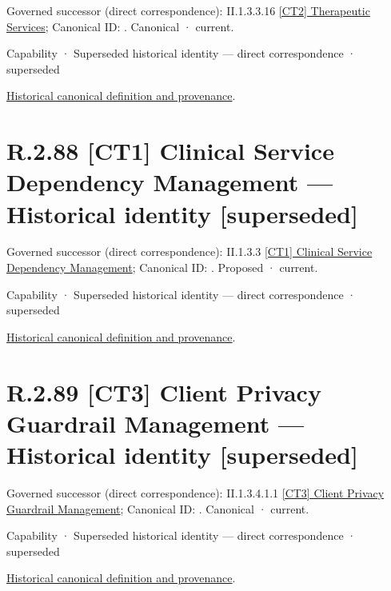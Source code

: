 {\small Governed successor (direct correspondence): II.1.3.3.16 \hyperref[element:b512b6d326004cb7b91a627fe6dbd8be]{[CT2] Therapeutic Services}; Canonical ID: \texttt{}. Canonical · current.}\par
\label{element:54032b52ee444bfe8b611fb9e8e2ba10}
{\small Capability · Superseded historical identity — direct correspondence · superseded}\par
\href{../../../../continuum/strategy/capability/54032b52ee444bfe8b611fb9e8e2ba10.md}{Historical canonical definition and provenance}.\par
\section*{R.2.88 [CT1] Clinical Service Dependency Management — Historical identity [superseded]}
\label{navigation:R.2.88}

{\small Governed successor (direct correspondence): II.1.3.3 \hyperref[element:232db9b8b47c450cb0aa9acaf539c09d]{[CT1] Clinical Service Dependency Management}; Canonical ID: \texttt{}. Proposed · current.}\par
\label{element:984ee17123eb4f92b3e55e55d24459b8}
{\small Capability · Superseded historical identity — direct correspondence · superseded}\par
\href{../../../../continuum/strategy/capability/984ee17123eb4f92b3e55e55d24459b8.md}{Historical canonical definition and provenance}.\par
\section*{R.2.89 [CT3] Client Privacy Guardrail Management — Historical identity [superseded]}
\label{navigation:R.2.89}

{\small Governed successor (direct correspondence): II.1.3.4.1.1 \hyperref[element:7577a6e1815243648dd5356c21cca151]{[CT3] Client Privacy Guardrail Management}; Canonical ID: \texttt{}. Canonical · current.}\par
\label{element:d2e6078b5db041cb904e0cadcebce6eb}
{\small Capability · Superseded historical identity — direct correspondence · superseded}\par
\href{../../../../continuum/strategy/capability/d2e6078b5db041cb904e0cadcebce6eb.md}{Historical canonical definition and provenance}.\par
